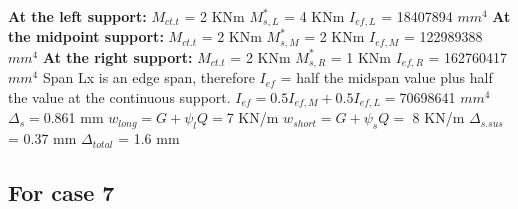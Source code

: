 \documentclass{article}%
\begin{document}
%
\newline%
\newline%
%
\textbf{At the left support:}%
\newline%
\newline%
%
$M_{ct.t}$ = 2 KNm%
\newline%
%
$M_{s,L}^{*}$ = 4 KNm%
\newline%
%
$I_{ef,L}$ = 18407894 $mm^{4}$%
\newline%
\newline%
%
\textbf{At the midpoint support:}%
\newline%
\newline%
%
$M_{ct.t}$ = 2 KNm%
\newline%
%
$M_{s,M}^{*}$ = 2 KNm%
\newline%
%
$I_{ef,M}$ = 122989388 $mm^{4}$%
\newline%
\newline%
%
\textbf{At the right support:}%
\newline%
\newline%
%
$M_{ct.t}$ = 2 KNm%
\newline%
%
$M_{s,R}^{*}$ = 1 KNm%
\newline%
%
$I_{ef,R}$ = 162760417 $mm^{4}$%
\newline%
\newline%
%
Span Lx is an edge span, therefore $I_{ef}$ = half the midspan value plus half the value at the continuous support.%
\newline%
\newline%
%
$I_{ef} = 0.5I_{ef,M} + 0.5I_{ef,L} = $70698641 $ mm^{4}$%
\newline%
\newline%
%
$\Delta_{s} =$0.861 mm%
\newline%
\newline%
%
$w_{long} = G + \psi_{l}Q = $7 KN/m%
\newline%
%
$w_{short} = G + \psi_{s}Q = $ 8 KN/m%
\newline%
\newline%
%
$\Delta_{s.sus}$ = 0.37 mm%
\newline%
\newline%
%
$\Delta_{total}$ = 1.6 mm%
\subsection*{For case 7}%
\label{subsec:Forcase7}%
\end{document}

